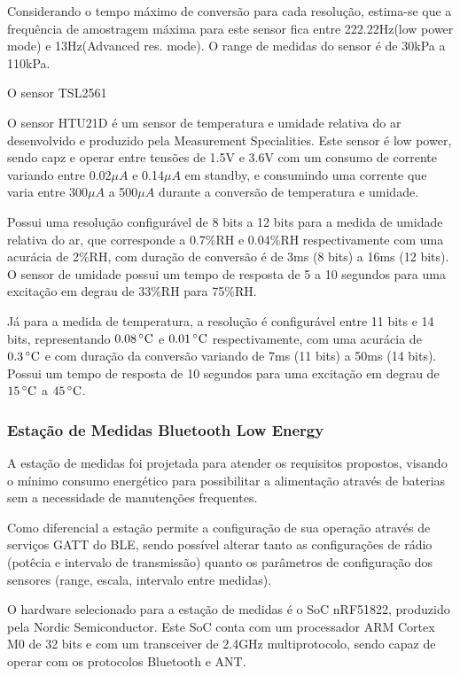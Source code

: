 Considerando o tempo máximo de conversão para cada resolução,
estima-se que a frequência de amostragem máxima para este sensor fica entre
222.22Hz(low power mode) e 13Hz(Advanced res. mode). O range de medidas do
sensor é de 30kPa a 110kPa. \cite{BMP180Datasheet}

O sensor TSL2561 

O sensor HTU21D é um sensor de temperatura e umidade relativa do ar desenvolvido
e produzido pela Measurement Specialities. Este sensor é low power, sendo capz e operar
entre tensões de 1.5V e 3.6V com um consumo de corrente variando entre 0.02$\mu
A$ e 0.14$\mu A$ em standby, e consumindo uma corrente que varia entre 300$\mu
A$ a 500$\mu A$ durante a conversão de temperatura e umidade. \cite{HTU21DDatasheet}

Possui uma  resolução configurável de 8 bits a 12 bits para a medida de umidade
relativa do ar, que corresponde a 0.7\%RH e 0.04\%RH respectivamente com uma
acurácia de 2\%RH, com duração de conversão é de 3ms (8 bits) a 16ms (12 bits).
O sensor de umidade possui um tempo de resposta de 5 a 10 segundos para uma
excitação em degrau de 33\%RH para 75\%RH. \cite{HTU21DDatasheet}

Já para a medida de temperatura, a resolução é configurável entre 11 bits e 14
bits, representando $0.08\,^{\circ}{\rm C}$ e $0.01\,^{\circ}{\rm C}$
respectivamente, com uma acurácia de $0.3\,^{\circ}{\rm C}$ e com duração da
conversão variando de 7ms (11 bits) a 50ms (14 bits). Possui um tempo de
resposta de 10 segundos para uma excitação em degrau de $15\,^{\circ}{\rm C}$ a
$45\,^{\circ}{\rm C}$.\cite{HTU21DDatasheet}

\subsubsection{Estação de Medidas Bluetooth Low Energy}

A estação de medidas foi projetada para atender os requisitos propostos,
visando o mínimo consumo energético para possibilitar a alimentação através de
baterias sem a necessidade de manutenções frequentes.
 
Como diferencial a estação permite a configuração de sua operação através de
serviços GATT do BLE, sendo possível alterar tanto as configurações de rádio
(potêcia e intervalo de transmissão) quanto os parâmetros de configuração dos
sensores (range, escala, intervalo entre medidas).

O hardware selecionado para a estação de medidas é o SoC nRF51822, produzido
pela Nordic Semiconductor. Este SoC conta com um processador ARM Cortex M0 de 32
bits e com um transceiver de 2.4GHz multiprotocolo, sendo capaz de operar com
os protocolos Bluetooth e ANT.\cite{nRF51ProdSpec}

